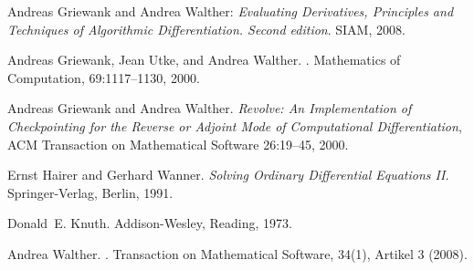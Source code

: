 \documentclass[11pt,twoside]{article}
\begin{document}
\begin{thebibliography}{10}
Andreas Griewank and Andrea Walther: {\em Evaluating Derivatives, Principles and Techniques of
  Algorithmic Differentiation. Second edition}. SIAM, 2008.


Andreas Griewank, Jean Utke, and Andrea Walther.
.
\newblock Mathematics of Computation, 69:1117--1130, 2000.

Andreas Griewank and Andrea Walther. {\em Revolve: An Implementation of Checkpointing for the Reverse
                 or Adjoint Mode of Computational Differentiation},
		 ACM Transaction on Mathematical Software 26:19--45, 2000.

    Ernst Hairer and Gerhard Wanner.
    {\it Solving Ordinary Differential Equations II.\/}
    Springer-Verlag, Berlin, 1991.

Donald~E. Knuth.
\newblock Addison-Wesley, Reading, 1973.

Andrea Walther.
.
\newblock Transaction on Mathematical Software, 34(1), Artikel 3 (2008).
\end{thebibliography}
\end{document}

